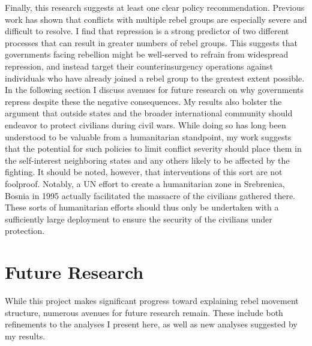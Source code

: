\documentclass[12pt,]{book}
\theoremstyle{definition}
\theoremstyle{definition}
\theoremstyle{remark}
\begin{document}
Finally, this research suggests at least one clear policy
recommendation. Previous work has shown that conflicts with multiple
rebel groups are especially severe and difficult to resolve. I find that
repression is a strong predictor of two different processes that can
result in greater numbers of rebel groups. This suggests that
governments facing rebellion might be well-served to refrain from
widespread repression, and instead target their counterinsurgency
operations against individuals who have already joined a rebel group to
the greatest extent possible. In the following section I discuss avenues
for future research on why governments repress despite these the
negative consequences. My results also bolster the argument that outside
states and the broader international community should endeavor to
protect civilians during civil wars. While doing so has long been
understood to be valuable from a humanitarian standpoint, my work
suggests that the potential for such policies to limit conflict severity
should place them in the self-interest neighboring states and any others
likely to be affected by the fighting. It should be noted, however, that
interventions of this sort are not foolproof. Notably, a UN effort to
create a humanitarian zone in Srebrenica, Bosnia in 1995 actually
facilitated the massacre of the civilians gathered there. These sorts of
humanitarian efforts should thus only be undertaken with a sufficiently
large deployment to ensure the security of the civilians under
protection.

\section{Future Research}\label{future-research}

While this project makes significant progress toward explaining rebel
movement structure, numerous avenues for future research remain. These
include both refinements to the analyses I present here, as well as new
analyses suggested by my results.
\end{document}

